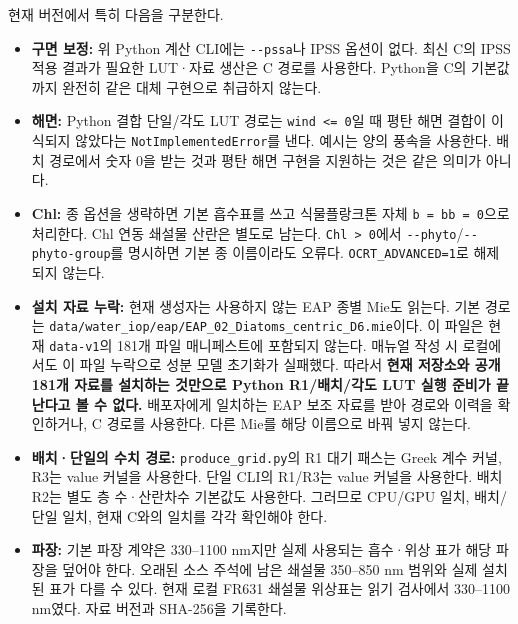 현재 버전에서 특히 다음을 구분한다.

\begin{itemize}
\item \textbf{구면 보정:} 위 Python 계산 CLI에는 \texttt{-\allowbreak{}-\allowbreak{}pssa}나 IPSS 옵션이 없다. 최신 C의 IPSS 적용 결과가 필요한 LUT·자료 생산은 C 경로를 사용한다. Python을 C의 기본값까지 완전히 같은 대체 구현으로 취급하지 않는다.
\item \textbf{해면:} Python 결합 단일/각도 LUT 경로는 \texttt{wind <=\allowbreak{} 0}일 때 평탄 해면 결합이 이식되지 않았다는 \texttt{NotImplementedEr\allowbreak{}ror}를 낸다. 예시는 양의 풍속을 사용한다. 배치 경로에서 숫자 0을 받는 것과 평탄 해면 구현을 지원하는 것은 같은 의미가 아니다.
\item \textbf{Chl:} 종 옵션을 생략하면 기본 흡수표를 쓰고 식물플랑크톤 자체 \texttt{b =\allowbreak{} bb =\allowbreak{} 0}으로 처리한다. Chl 연동 쇄설물 산란은 별도로 남는다. \texttt{Chl > 0}에서 \texttt{-\allowbreak{}-\allowbreak{}phyto}/\texttt{-\allowbreak{}-\allowbreak{}phyto-\allowbreak{}group}를 명시하면 기본 종 이름이라도 오류다. \texttt{OCRT\_\allowbreak{}ADVANCED=\allowbreak{}1}로 해제되지 않는다.
\item \textbf{설치 자료 누락:} 현재 생성자는 사용하지 않는 EAP 종별 Mie도 읽는다. 기본 경로는 \texttt{data/\allowbreak{}water\_\allowbreak{}iop/\allowbreak{}eap/\allowbreak{}EAP\_\allowbreak{}02\_\allowbreak{}Diatoms\_\allowbreak{}centric\_\allowbreak{}D6.\allowbreak{}mie}이다. 이 파일은 현재 \texttt{data-\allowbreak{}v1}의 181개 파일 매니페스트에 포함되지 않는다. 매뉴얼 작성 시 로컬에서도 이 파일 누락으로 성분 모델 초기화가 실패했다. 따라서 \textbf{현재 저장소와 공개 181개 자료를 설치하는 것만으로 Python R1/배치/각도 LUT 실행 준비가 끝난다고 볼 수 없다.} 배포자에게 일치하는 EAP 보조 자료를 받아 경로와 이력을 확인하거나, C 경로를 사용한다. 다른 Mie를 해당 이름으로 바꿔 넣지 않는다.
\item \textbf{배치·단일의 수치 경로:} \texttt{produce\_\allowbreak{}grid.\allowbreak{}py}의 R1 대기 패스는 Greek 계수 커널, R3는 value 커널을 사용한다. 단일 CLI의 R1/R3는 value 커널을 사용한다. 배치 R2는 별도 층 수·산란차수 기본값도 사용한다. 그러므로 CPU/GPU 일치, 배치/단일 일치, 현재 C와의 일치를 각각 확인해야 한다.
\item \textbf{파장:} 기본 파장 계약은 330--1100 nm지만 실제 사용되는 흡수·위상 표가 해당 파장을 덮어야 한다. 오래된 소스 주석에 남은 쇄설물 350--850 nm 범위와 실제 설치된 표가 다를 수 있다. 현재 로컬 FR631 쇄설물 위상표는 읽기 검사에서 330--1100 nm였다. 자료 버전과 SHA-256을 기록한다.
\end{itemize}

